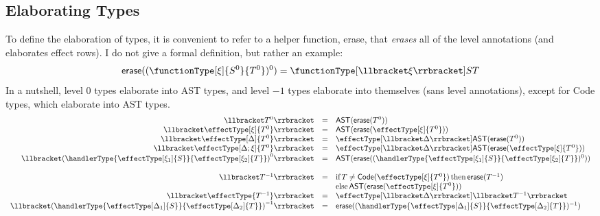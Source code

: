 \subsection{Elaborating Types}
To define the elaboration of types, it is convenient to refer to a helper function, \textsf{erase}, that \textit{erases} all of the level annotations (and elaborates effect rows). I do not give a formal definition, but rather an example: 
\[\textsf{erase}((\functionType[\xi]{S^0}{T^0})^0) = \functionType[\elaborate{\xi}]{S}{T}\]
In a nutshell, level $0$ types elaborate into \textsf{AST} types, and level $-1$ types elaborate into themselves (sans level annotations), except for \textsf{Code} types, which elaborate into \textsf{AST} types.
\[
\begin{array}{rcl}
  \elaborate{T^0} & = & \AST{\erase{T^0}}\\
  \elaborate{\effectType[\xi]{T^0}} & = & \AST{\erase{\effectType[\xi]{T^0}}}\\
  \elaborate{\effectType[\Delta]{T^0}} & = & \effectType[\elaborate{\Delta}]{\AST{\erase{T^0}}}\\
  \elaborate{\effectType[\Delta ; \xi]{T^0}} & = & \effectType[\elaborate{\Delta}]{\AST{\erase{\effectType[\xi]{T^0}}}}\\
  \elaborate{{(\handlerType{\effectType[\xi_1]{S}}{\effectType[\xi_2]{T}})}^0} & = & {\AST{\erase{(\handlerType{\effectType[\xi_1]{S}}{\effectType[\xi_2]{T}})^0}}}\\\\
  \elaborate{T^{-1}} & = & \text{if} \, T \neq \Code{\effectType[\xi]{T^0}} \, \text{then} \, \erase{T^{-1}} \\ && \text{else}\, \AST{\erase{\effectType[\xi]{T^0}}}\\
  \elaborate{\effectType{T^{-1}}} & = & \effectType[\elaborate{\Delta}]{\elaborate{T^{-1}}}\\
  \elaborate{{(\handlerType{\effectType[\Delta_1]{S}}{\effectType[\Delta_2]{T}})}^{-1}} & = & {\erase{(\handlerType{\effectType[\Delta_1]{S}}{\effectType[\Delta_2]{T}})^{-1}}}
\end{array}
\]
